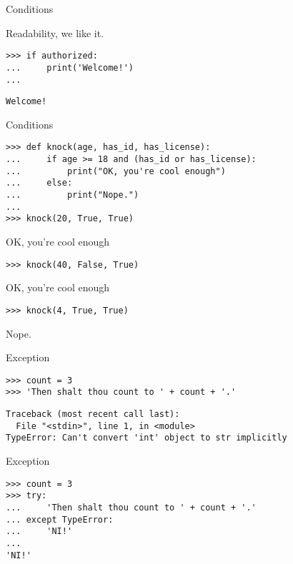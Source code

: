\documentclass[ignorenonframetext,]{beamer}
\begin{document}
\begin{frame}[fragile]{Conditions}

    Readability, we like it.

    \begin{tcolorbox}
    \begin{verbatim}
>>> if authorized:
...     print('Welcome!')
...
    \end{verbatim}
    \begin{verbatim}
Welcome!
    \end{verbatim}
    \end{tcolorbox}
\end{frame}

\begin{frame}[fragile]{Conditions}
    \begin{tcolorbox}
    \begin{verbatim}
>>> def knock(age, has_id, has_license):
...     if age >= 18 and (has_id or has_license):
...         print("OK, you're cool enough")
...     else:
...         print("Nope.")
...
>>> knock(20, True, True)
    \end{verbatim}
OK, you're cool enough
    \begin{verbatim}
>>> knock(40, False, True)
    \end{verbatim}
OK, you're cool enough
    \begin{verbatim}
>>> knock(4, True, True)
    \end{verbatim}
Nope.
    \end{tcolorbox}
\end{frame}

\begin{frame}[fragile]{Exception}
    \begin{tcolorbox}
    \begin{verbatim}
>>> count = 3
>>> 'Then shalt thou count to ' + count + '.'
    \end{verbatim}
    \begin{verbatim}
Traceback (most recent call last):
  File "<stdin>", line 1, in <module>
TypeError: Can't convert 'int' object to str implicitly
    \end{verbatim}
    \end{tcolorbox}
\end{frame}

\begin{frame}[fragile]{Exception}
    \begin{tcolorbox}
    \begin{verbatim}
>>> count = 3
>>> try:
...     'Then shalt thou count to ' + count + '.'
... except TypeError:
...     'NI!'
...
'NI!'
    \end{verbatim}
    \end{tcolorbox}
\end{frame}
\end{document}
